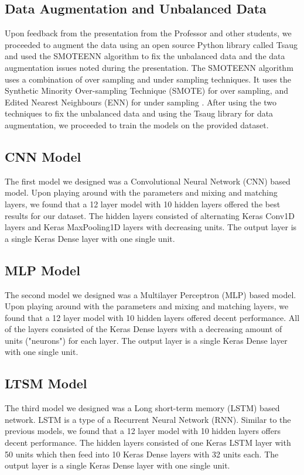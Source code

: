 \documentclass[conference]{IEEEtran}
\begin{document}
\subsection{Data Augmentation and Unbalanced Data}
Upon feedback from the presentation from the Professor and other students, we proceeded to augment the data using an open source Python library called Tsaug \cite{b3} and used the SMOTEENN algorithm \cite{b4} to fix the unbalanced data and the data augmentation issues noted during the presentation. The SMOTEENN algorithm uses a combination of over sampling and under sampling techniques. It uses the Synthetic Minority Over-sampling Technique (SMOTE) \cite{b5} for over sampling, and Edited Nearest Neighbours (ENN) for under sampling \cite{b6}. After using the two techniques to fix the unbalanced data and using the Tsaug library for data augmentation, we proceeded to train the models on the provided dataset.
\subsection{CNN Model}
The first model we designed was a Convolutional Neural Network (CNN) based model. Upon playing around with the parameters and mixing and matching layers, we found that a 12 layer model with 10 hidden layers offered the best results for our dataset. The hidden layers consisted of alternating Keras Conv1D layers and Keras MaxPooling1D layers with decreasing units. The output layer is a single Keras Dense layer with one single unit.
\subsection{MLP Model}
The second model we designed was a Multilayer Perceptron (MLP) based model. Upon playing around with the parameters and mixing and matching layers, we found that a 12 layer model with 10 hidden layers offered decent performance. All of the layers consisted of the Keras Dense layers with a decreasing amount of units ("neurons") for each layer. The output layer is a single Keras Dense layer with one single unit. 
\subsection{LTSM Model}
The third model we designed was a Long short-term memory (LSTM) based network. LSTM is a type of a Recurrent Neural Network (RNN). Similar to the previous models, we found that a 12 layer model with 10 hidden layers offers decent performance. The hidden layers consisted of one Keras LSTM layer with 50 units which then feed into 10 Keras Dense layers with 32 units each. The output layer is a single Keras Dense layer with one single unit.
\end{document}
